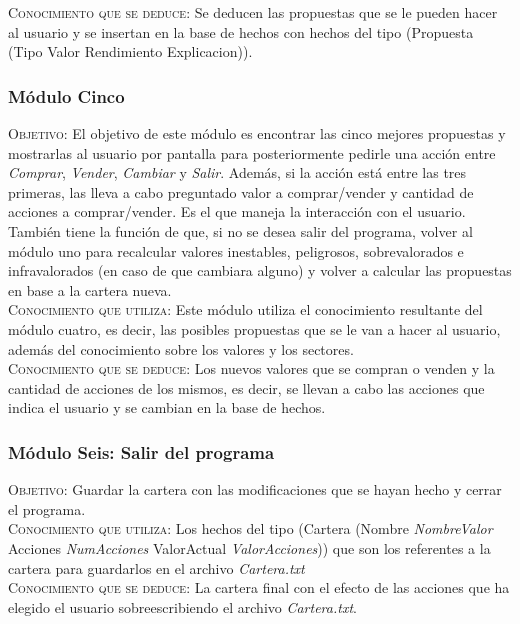 \documentclass[12pt]{article}
\begin{document}
\textsc{Conocimiento que se deduce}: Se deducen las propuestas que se le pueden hacer al usuario y se insertan en la base de hechos con hechos del tipo (Propuesta (Tipo Valor Rendimiento Explicacion)).

\subsubsection{Módulo Cinco}
\textsc{Objetivo}: El objetivo de este módulo es encontrar las cinco mejores propuestas y mostrarlas al usuario por pantalla para posteriormente pedirle una acción entre \textit{Comprar}, \textit{Vender}, \textit{Cambiar} y \textit{Salir}. Además, si la acción está entre las tres primeras, las lleva a cabo preguntado valor a comprar/vender y cantidad de acciones a comprar/vender. Es el que maneja la interacción con el usuario. También tiene la función de que, si no se desea salir del programa, volver al módulo uno para recalcular valores inestables, peligrosos, sobrevalorados e infravalorados (en caso de que cambiara alguno) y volver a calcular las propuestas en base a la cartera nueva.\\

\textsc{Conocimiento que utiliza}: Este módulo utiliza el conocimiento resultante del módulo cuatro, es decir, las posibles propuestas que se le van a hacer al usuario, además del conocimiento sobre los valores y los sectores.\\

\textsc{Conocimiento que se deduce}: Los nuevos valores que se compran o venden y la cantidad de acciones de los mismos, es decir, se llevan a cabo las acciones que indica el usuario y se cambian en la base de hechos.

\subsubsection{Módulo Seis: Salir del programa}
\textsc{Objetivo}: Guardar la cartera con las modificaciones que se hayan hecho y cerrar el programa.\\

\textsc{Conocimiento que utiliza}: Los hechos del tipo (Cartera (Nombre \textit{NombreValor} Acciones \textit{NumAcciones} ValorActual \textit{ValorAcciones})) que son los referentes a la cartera para guardarlos en el archivo \textit{Cartera.txt} \\

\textsc{Conocimiento que se deduce}: La cartera final con el efecto de las acciones que ha elegido el usuario sobreescribiendo el archivo \textit{Cartera.txt}.
\end{document}
